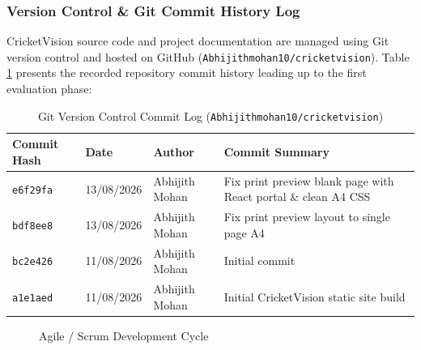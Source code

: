 \documentclass[12pt,a4paper]{report}
\begin{document}
\subsubsection{Version Control \& Git Commit History Log}
CricketVision source code and project documentation are managed using Git version control and hosted on GitHub (\texttt{Abhijithmohan10/cricketvision}). Table \ref{tab:git_history} presents the recorded repository commit history leading up to the first evaluation phase:

\begin{table}[H]
\centering
\caption{Git Version Control Commit Log (\texttt{Abhijithmohan10/cricketvision})}
\label{tab:git_history}
\begin{tabular}{llll}
\toprule
\textbf{Commit Hash} & \textbf{Date} & \textbf{Author} & \textbf{Commit Summary} \\
\midrule
\texttt{e6f29fa} & 13/08/2026 & Abhijith Mohan & Fix print preview blank page with React portal \& clean A4 CSS \\
\texttt{bdf8ee8} & 13/08/2026 & Abhijith Mohan & Fix print preview layout to single page A4 \\
\texttt{bc2e426} & 11/08/2026 & Abhijith Mohan & Initial commit \\
\texttt{a1e1aed} & 11/08/2026 & Abhijith Mohan & Initial CricketVision static site build \\
\bottomrule
\end{tabular}
\end{table}

\begin{figure}[H]
\centering
{}
\caption{Agile / Scrum Development Cycle}
\label{fig:scrum_cycle}
\end{figure}
\end{document}
